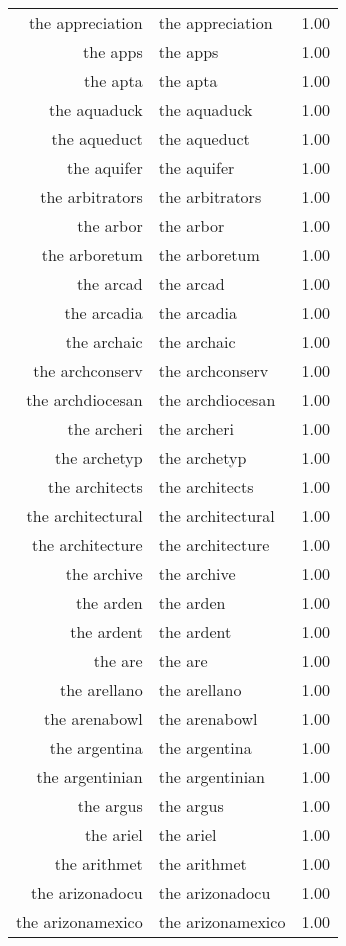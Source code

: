 \begin{table}[ht]
\begin{tabular}{rlr}
  the appreciation & the appreciation & 1.00 \\ 
  the apps & the apps & 1.00 \\ 
  the apta & the apta & 1.00 \\ 
  the aquaduck & the aquaduck & 1.00 \\ 
  the aqueduct & the aqueduct & 1.00 \\ 
  the aquifer & the aquifer & 1.00 \\ 
  the arbitrators & the arbitrators & 1.00 \\ 
  the arbor & the arbor & 1.00 \\ 
  the arboretum & the arboretum & 1.00 \\ 
  the arcad & the arcad & 1.00 \\ 
  the arcadia & the arcadia & 1.00 \\ 
  the archaic & the archaic & 1.00 \\ 
  the archconserv & the archconserv & 1.00 \\ 
  the archdiocesan & the archdiocesan & 1.00 \\ 
  the archeri & the archeri & 1.00 \\ 
  the archetyp & the archetyp & 1.00 \\ 
  the architects & the architects & 1.00 \\ 
  the architectural & the architectural & 1.00 \\ 
  the architecture & the architecture & 1.00 \\ 
  the archive & the archive & 1.00 \\ 
  the arden & the arden & 1.00 \\ 
  the ardent & the ardent & 1.00 \\ 
  the are & the are & 1.00 \\ 
  the arellano & the arellano & 1.00 \\ 
  the arenabowl & the arenabowl & 1.00 \\ 
  the argentina & the argentina & 1.00 \\ 
  the argentinian & the argentinian & 1.00 \\ 
  the argus & the argus & 1.00 \\ 
  the ariel & the ariel & 1.00 \\ 
  the arithmet & the arithmet & 1.00 \\ 
  the arizonadocu & the arizonadocu & 1.00 \\ 
  the arizonamexico & the arizonamexico & 1.00 \\ 

\end{tabular}
\end{table}
